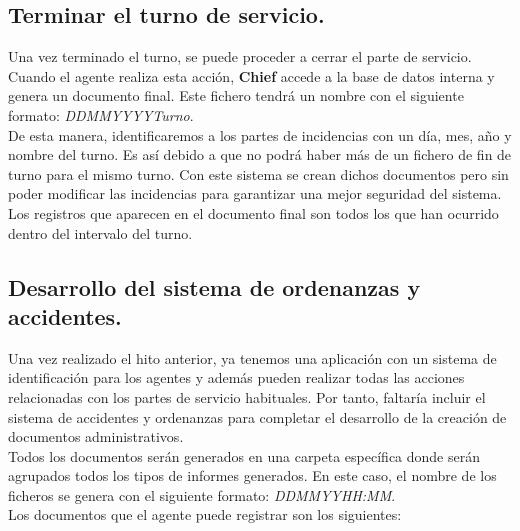\subsection{Terminar el turno de servicio.}

Una vez terminado el turno, se puede proceder a cerrar el parte de servicio. Cuando el agente realiza esta acción, \textbf{Chief} accede 
a la base de datos interna y genera un documento final. Este fichero tendrá un nombre con el siguiente formato: \textit{DD\textunderscore MM\textunderscore YYYY\textunderscore Turno}.\\	

De esta manera, identificaremos a los partes de incidencias con un día, mes, año y nombre del turno. Es así debido a que no podrá haber más de un fichero de fin 
de turno para el mismo turno. Con este sistema se crean dichos documentos pero sin poder modificar las incidencias para garantizar una mejor seguridad del sistema. Los registros que aparecen en el documento
final son todos los que han ocurrido dentro del intervalo del turno.

\subsection{Desarrollo del sistema de ordenanzas y accidentes.}

Una vez realizado el hito anterior, ya tenemos una aplicación con un sistema de identificación para los agentes y además pueden realizar todas las acciones
relacionadas con los partes de servicio habituales. Por tanto, faltaría incluir el sistema de accidentes y ordenanzas para completar el desarrollo de la
creación de documentos administrativos.\\

Todos los documentos serán generados en una carpeta específica donde serán agrupados todos los tipos de informes generados. En este caso, el nombre de los ficheros se
genera con el siguiente formato: \textit{DD\textunderscore MM\textunderscore YY\textunderscore HH:MM}.\\

Los documentos que el agente puede registrar son los siguientes:

